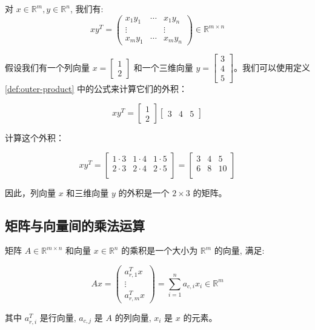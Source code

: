 \documentclass[lang=cn,newtx,10pt,scheme=chinese]{elegantbook}
\begin{document}
\begin{definition}[外积] \label{def:outer-product} 
对 $x \in \mathbb{R}^m, y \in \mathbb{R}^n$, 我们有:
$$
x y^T=\left(\begin{array}{ccc}
x_1 y_1 & \cdots & x_1 y_n \\
\vdots & & \vdots \\
x_m y_1 & \cdots & x_m y_n
\end{array}\right) \in \mathbb{R}^{m \times n}
$$
\end{definition}

\begin{exercise}
    假设我们有一个列向量 $x = \begin{bmatrix} 1 \\ 2 \end{bmatrix}$ 和一个三维向量 $y = \begin{bmatrix} 3 \\ 4 \\ 5 \end{bmatrix}$。我们可以使用定义 \ref{def:outer-product} 中的公式来计算它们的外积：

\[
x y^T = \begin{bmatrix} 1 \\ 2 \end{bmatrix} \begin{bmatrix} 3 & 4 & 5 \end{bmatrix}
\]

计算这个外积：

\[
x y^T = \begin{bmatrix}
1 \cdot 3 & 1 \cdot 4 & 1 \cdot 5 \\
2 \cdot 3 & 2 \cdot 4 & 2 \cdot 5 \\
\end{bmatrix} = \begin{bmatrix}
3 & 4 & 5 \\
6 & 8 & 10 \\
\end{bmatrix}
\]

因此，列向量 $x$ 和三维向量 $y$ 的外积是一个 $2 \times 3$ 的矩阵。
\end{exercise}

\subsection{矩阵与向量间的乘法运算}

\begin{definition}[矩阵与向量间的乘法运算] \label{def:mat-vec-multi}

矩阵 $A \in \mathbb{R}^{m \times n}$ 和向量 $x \in \mathbb{R}^n$ 的乘积是一个大小为 $\mathbb{R}^m$ 的向量, 满足:

$$
A x=\left(\begin{array}{c}
a_{r, 1}^T x \\
\vdots \\
a_{r, m}^T x
\end{array}\right)=\sum_{i=1}^n a_{c, i} x_i \in \mathbb{R}^m
$$

其中 $a_{r, i}^T$ 是行向量, $a_{c, j}$ 是 $A$ 的列向量, $x_i$ 是 $x$ 的元素。
\end{definition}
\end{document}
